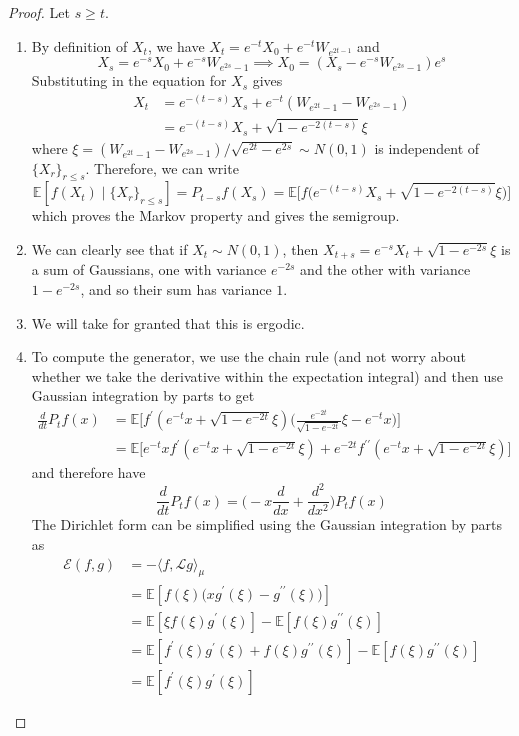 \documentclass{article}
\theoremstyle{definition}
\theoremstyle{remark}
\theoremstyle{definition}
\begin{document}
  \begin{proof}
  Let $s \geq t$. 
  \begin{enumerate}
      \item By definition of $X_t$, we have $X_t = e^{-t} X_0 + e^{-t} W_{e^{2t - 1}}$ and 
      \[X_s = e^{-s} X_0 + e^{-s} W_{e^{2s} - 1} \implies X_0 = (X_s - e^{-s} W_{e^{2s} - 1} ) e^{s}\]
      Substituting in the equation for $X_s$ gives 
      \begin{align*}
          X_t & = e^{-(t - s)} X_s + e^{-t} (W_{e^{2t} - 1} - W_{e^{2s} - 1}) \\
          & = e^{-(t - s)} X_s + \sqrt{1 - e^{-2 (t - s)}} \xi
      \end{align*}
      where $\xi = (W_{e^{2t} - 1} - W_{e^{2s} - 1}) / \sqrt{e^{2t} - e^{2s}} \sim N(0, 1)$ is independent of $\{X_r\}_{r \leq s}$. Therefore, we can write 
      \[\mathbb{E}[ f(X_t) \mid \{X_r\}_{r \leq s}] = P_{t - s} f (X_s) = \mathbb{E}\big[f \big( e^{-(t - s)} X_s + \sqrt{1 - e^{-2 (t - s)}} \xi \big) \big]\]
      which proves the Markov property and gives the semigroup. 
      
      \item We can clearly see that if $X_t \sim N(0, 1)$, then $X_{t + s} = e^{-s} X_t + \sqrt{1 - e^{-2s}}\xi$ is a sum of Gaussians, one with variance $e^{-2s}$ and the other with variance $1 - e^{-2s}$, and so their sum has variance $1$. 
      
      \item We will take for granted that this is ergodic. 
      
      \item To compute the generator, we use the chain rule (and not worry about whether we take the derivative within the expectation integral) and then use Gaussian integration by parts to get 
      \begin{align*}
          \frac{d}{dt} P_t f(x) & = \mathbb{E} \bigg[ f^\prime (e^{-t} x + \sqrt{1 - e^{-2t}} \xi) \bigg( \frac{e^{-2t}}{\sqrt{1 - e^{-2t}}} \xi - e^{-t} x \bigg) \bigg] \\
          & = \mathbb{E} \big[ e^{-t} x f^\prime (e^{-t} x + \sqrt{1 - e^{-2t}} \xi) + e^{-2t} f^{\prime\prime} (e^{-t} x + \sqrt{1 - e^{-2t}} \xi ) \big]
      \end{align*}
      and therefore have 
      \[\frac{d}{dt} P_t f (x) = \bigg( -x \frac{d}{dx} + \frac{d^2}{dx^2} \bigg) P_t f (x)\]
      The Dirichlet form can be simplified using the Gaussian integration by parts as 
      \begin{align*}
          \mathcal{E} (f, g) & = - \langle f, \mathscr{L} g \rangle_\mu \\
          & = \mathbb{E}[ f(\xi) \big( x g^\prime (\xi) - g^{\prime\prime} (\xi) \big)] \\
          & = \mathbb{E}[\xi f(\xi) g^\prime(\xi)] - \mathbb{E}[f(\xi) g^{\prime\prime} (\xi)] \\
          & = \mathbb{E}[f^\prime (\xi) g^\prime (\xi) + f(\xi) g^{\prime\prime} (\xi)] - \mathbb{E}[f(\xi) g^{\prime\prime} (\xi)] \\
          & = \mathbb{E}[f^\prime (\xi) g^\prime (\xi) ]
      \end{align*} 
      

\end{enumerate}
\end{proof}
\end{document}
